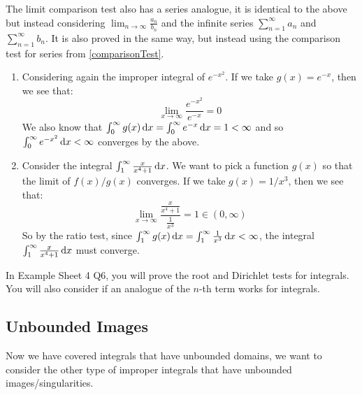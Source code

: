\documentclass[../main.tex]{subfiles}
\begin{document}
\begin{remark}
  The limit comparison test also has a series analogue, it is identical to the above but instead considering $\lim_{n \to \infty} \frac{a_n}{b_n}$ and the infinite series $\sum_{n = 1}^{\infty} a_n$ and $\sum_{n = 1}^{\infty} b_n$.
  It is also proved in the same way, but instead using the comparison test for series from \cref{comparisonTest}.
\end{remark}
\begin{example}
  \begin{enumerate}
    \item Considering again the improper integral of $e^{-x^2}$.
      If we take $g(x) = e^{-x}$, then we see that:
      \[
        \lim_{x \to \infty} \frac{e^{-x^2}}{e^{-x}} = 0
      \]
      We also know that $\int_{0}^{\infty} g(x) \d{x} = \int_{0}^{\infty} e^{-x} \d{x} = 1 < \infty$ and so $\int_{0}^{\infty} e^{-x^2} \d{x} < \infty$ converges by the above.
    \item Consider the integral $\int_{1}^{\infty} \frac{x}{x^{4} + 1} \d{x}$.
      We want to pick a function $g(x)$ so that the limit of $f(x)/g(x)$ converges.
      If we take $g(x) = 1/x^3$, then we see that:
      \[
        \lim_{x \to \infty} \frac{\frac{x}{x^4 + 1}}{\frac{1}{x^3}} = 1 \in (0, \infty)
      \]
      So by the ratio test, since $\int_{1}^{\infty} g(x) \d{x} = \int_{1}^{\infty} \frac{1}{x^3} \d{x} < \infty$, the integral $\int_{1}^{\infty} \frac{x}{x^4 + 1} \d{x}$ must converge.
  \end{enumerate}
\end{example}
\begin{remark}
  In Example Sheet 4 Q6, you will prove the root and Dirichlet tests for integrals.
  You will also consider if an analogue of the $n$-th term works for integrals.
\end{remark}
\subsection{Unbounded Images}
Now we have covered integrals that have unbounded domains, we want to consider the other type of improper integrals that have unbounded images/singularities.
\end{document}
